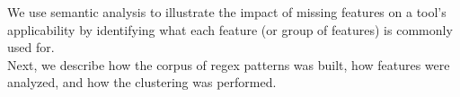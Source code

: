 We use semantic analysis to illustrate the impact of missing features on a tool's applicability by identifying what each feature (or group of features) is commonly used for. \\


Next, we describe how the corpus of regex patterns was built, how features were analyzed, and how the clustering was performed.




